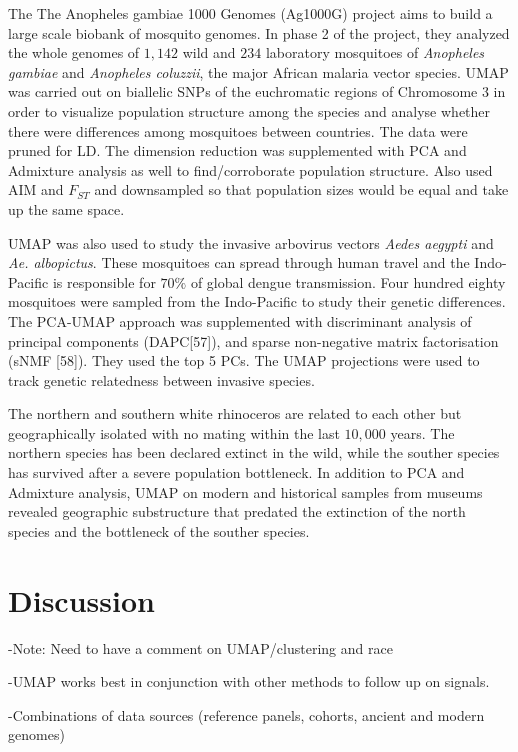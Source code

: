\documentclass[12pt]{article}
\begin{document}
The The Anopheles gambiae 1000 Genomes (Ag1000G) project aims to build a large scale biobank of mosquito genomes. In phase 2 of the project, they analyzed the whole genomes of $1,142$ wild and $234$ laboratory mosquitoes of \textit{Anopheles gambiae} and \textit{Anopheles coluzzii}, the major African malaria vector species. UMAP was carried out on biallelic SNPs of the euchromatic regions of Chromosome 3 in order to visualize population structure among the species and analyse whether there were differences among mosquitoes between countries. The data were pruned for LD. The dimension reduction was supplemented with PCA and Admixture analysis as well to find/corroborate population structure. Also used AIM and $F_{ST}$ and downsampled so that population sizes would be equal and take up the same space.\cite{consortium_genome_2020}


UMAP was also used to study the invasive arbovirus vectors \textit{Aedes aegypti} and \textit{Ae. albopictus}. These mosquitoes can spread through human travel and the Indo-Pacific is responsible for $70\%$ of global dengue transmission. Four hundred eighty mosquitoes were sampled from the Indo-Pacific to study their genetic differences. The PCA-UMAP approach was supplemented with discriminant analysis of principal components (DAPC[57]), and sparse non-negative matrix factorisation (sNMF [58]). They used the top 5 PCs. The UMAP projections were used to track genetic relatedness between invasive species.\cite{schmidt_population_2020}

The northern and southern white rhinoceros are related to each other but geographically isolated with no mating within the last $10,000$ years. The northern species has been declared extinct in the wild, while the souther species has survived after a severe population bottleneck. In addition to PCA and Admixture analysis, UMAP on modern and historical samples from museums revealed geographic substructure that predated the extinction of the north species and the bottleneck of the souther species.\cite{sanchez-barreiro_historical_2020}

\section*{Discussion}

-Note: Need to have a comment on UMAP/clustering and race

-UMAP works best in conjunction with other methods to follow up on signals.

-Combinations of data sources (reference panels, cohorts, ancient and modern genomes)
\end{document}

